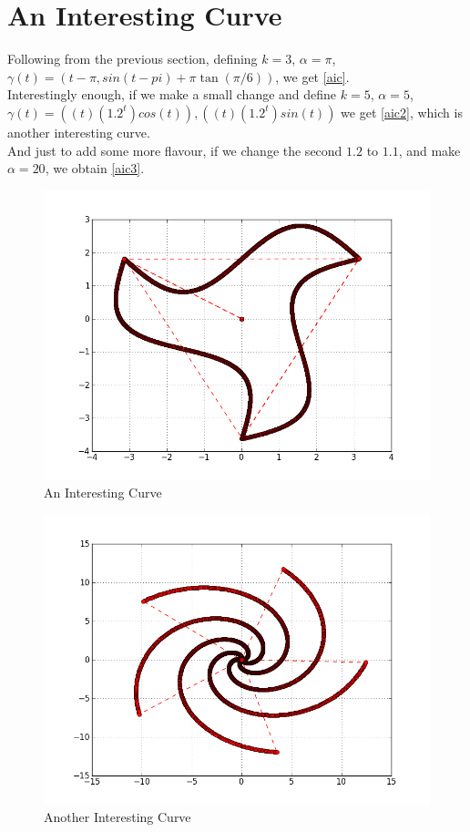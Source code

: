 \section{An Interesting Curve}
	Following from the previous section, defining $k=3$, $\alpha=\pi$, $\gamma(t)=(t-\pi,sin(t-pi) + \pi\tan(\pi/6))$, we get \autoref{aic}. 
	\\
	Interestingly enough, if we make a small change and define $k=5$, $\alpha=5$, $\gamma(t)=((t)(1.2^t)cos(t)),((t)(1.2^t)sin(t))$ we get \autoref{aic2}, which is another interesting curve.
	\\
	And just to add some more flavour, if we change the second $1.2$ to $1.1$, and make $\alpha=20$, we obtain \autoref{aic3}.
	\begin{figure}[bth]
		\begin{center}
			\includegraphics[width=0.9\linewidth]{img/sin_clone}
		\end{center}
	\caption[An Interesting Curve]{An Interesting Curve}
	\label{aic}
	\end{figure}

	\begin{figure}[bth]
		\begin{center}
			\includegraphics[width=0.9\linewidth]{img/spiral_lessdense_clone.png}
		\end{center}
	\caption[Another Interesting Curve]{Another Interesting Curve}
	\label{aic2}
	\end{figure}

